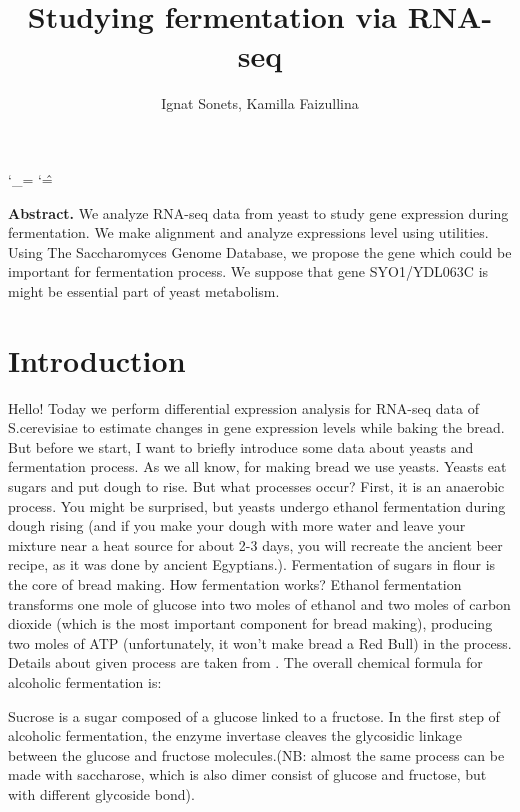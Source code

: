 \documentclass{article}
\title{Studying  fermentation via RNA-seq  }
\author{ Ignat Sonets, Kamilla Faizullina}
\date{\empty}
\begin{document}
	
		\catcode`\_=\active
	\catcode`\^=\active
	
\maketitle
 
\textbf{Abstract.}  We analyze RNA-seq data from yeast  to study gene expression   during fermentation. We make alignment and analyze expressions level using utilities. Using The Saccharomyces Genome Database, we propose the gene which could be important for fermentation process. We suppose that gene SYO1/YDL063C is might be essential part of yeast metabolism.
 
\section{Introduction}
 
 Hello! Today we perform differential expression analysis for RNA-seq data of S.cerevisiae to estimate changes in gene expression levels while baking the bread. But before we start, I want to briefly introduce some data about yeasts and fermentation process.
 As we all  know, for making bread we use yeasts. Yeasts eat sugars and put dough to rise. But what processes occur? First, it is an anaerobic process. You might be surprised, but yeasts undergo ethanol fermentation during dough rising (and if you make your dough with more water and leave your mixture near a heat source for about 2-3 days, you will recreate the ancient beer recipe, as it was done by ancient Egyptians.). Fermentation of sugars in flour is the core of bread making. How fermentation works? Ethanol fermentation transforms one mole of glucose into two moles of ethanol and two moles of carbon dioxide (which is the most important component for bread making), producing two moles of ATP (unfortunately, it won't make bread a Red Bull) in the process. 
 Details about given process are taken from \cite{1}.
 The overall chemical formula for alcoholic fermentation is:
 
 
 Sucrose is a sugar composed of a glucose linked to a fructose. In the first step of alcoholic fermentation, the enzyme invertase cleaves the glycosidic linkage between the glucose and fructose molecules.(NB: almost the same process can be made with saccharose, which is also dimer consist of glucose and fructose, but with different glycoside bond).
 
\end{document}
